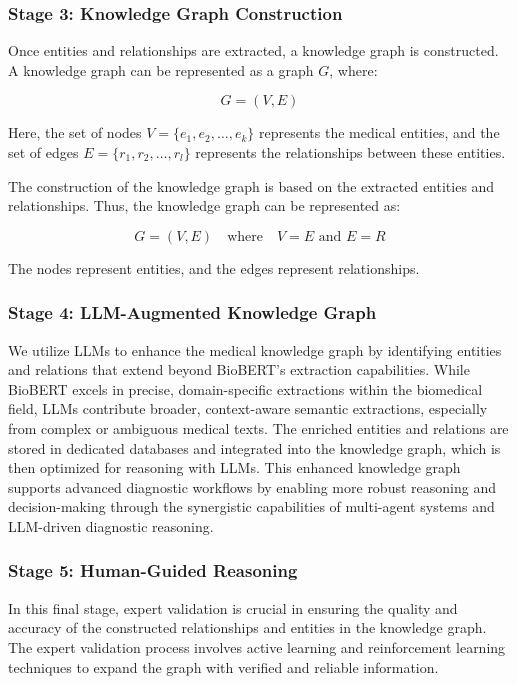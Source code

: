 \documentclass[letterpaper]{article} %
\begin{document}
\subsubsection*{Stage 3: Knowledge Graph Construction}
Once entities and relationships are extracted, a knowledge graph is constructed. A knowledge graph can be represented as a graph \( G \), where:

\[
G = (V, E)
\]

Here, the set of nodes \( V = \{e_1, e_2, \dots, e_k\} \) represents the medical entities, and the set of edges \( E = \{r_1, r_2, \dots, r_l\} \) represents the relationships between these entities.

The construction of the knowledge graph is based on the extracted entities and relationships. Thus, the knowledge graph can be represented as:

\[
G = (V, E) \quad \text{where} \quad V = E \text{ and } E = R
\]

The nodes represent entities, and the edges represent relationships.
\subsubsection*{Stage 4: LLM-Augmented Knowledge Graph}  
We utilize LLMs to enhance the medical knowledge graph by identifying entities and relations that extend beyond BioBERT's extraction capabilities. While BioBERT excels in precise, domain-specific extractions within the biomedical field, LLMs contribute broader, context-aware semantic extractions, especially from complex or ambiguous medical texts. The enriched entities and relations are stored in dedicated databases and integrated into the knowledge graph, which is then optimized for reasoning with LLMs. This enhanced knowledge graph supports advanced diagnostic workflows by enabling more robust reasoning and decision-making through the synergistic capabilities of multi-agent systems and LLM-driven diagnostic reasoning.\subsubsection*{Stage 5: Human-Guided Reasoning}
In this final stage, expert validation is crucial in ensuring the quality and accuracy of the constructed relationships and entities in the knowledge graph. The expert validation process involves active learning and reinforcement learning techniques to expand the graph with verified and reliable information.
\end{document}
